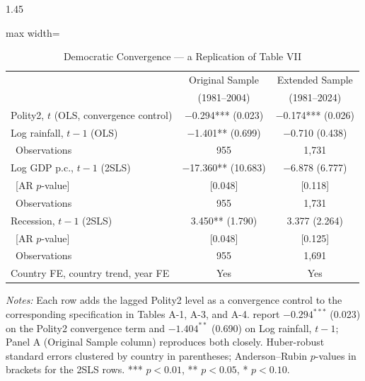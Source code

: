 \documentclass[12pt]{article}
\begin{document}
\begin{bibunit}[jpe]
\begin{spacing}{1.45}
\begin{table}[H]
\centering
\begin{adjustbox}{max width=\textwidth}
\begin{threeparttable}
\caption{Democratic Convergence --- a Replication of Table VII}
\label{tab:A5}
\begin{tabular}{lcc}
\toprule
 & Original Sample & Extended Sample \\
 & (1981--2004) & (1981--2024) \\
\midrule
Polity2, $t$ (OLS, convergence control) & $-$0.294*** (0.023) & $-$0.174*** (0.026) \\
Log rainfall, $t-1$ (OLS)               & $-$1.401** (0.699)  & $-$0.710 (0.438) \\
\ Observations                          & 955                 & 1{,}731 \\
Log GDP p.c., $t-1$ (2SLS)              & $-$17.360** (10.683) & $-$6.878 (6.777) \\
\ [AR $p$-value]                        & [0.048]             & [0.118] \\
\ Observations                          & 955                 & 1{,}731 \\
Recession, $t-1$ (2SLS)                 & 3.450** (1.790)     & 3.377 (2.264) \\
\ [AR $p$-value]                        & [0.048]             & [0.125] \\
\ Observations                          & 955                 & 1{,}691 \\
\midrule
Country FE, country trend, year FE & Yes & Yes \\
\bottomrule
\end{tabular}
\begin{tablenotes}[flushleft]
\footnotesize
\item \textit{Notes:} Each row adds the lagged Polity2 level as a convergence control to the corresponding specification in Tables A-1, A-3, and A-4. \citet{bruckner2011rain} report $-0.294^{***}$ (0.023) on the Polity2 convergence term and $-1.404^{**}$ (0.690) on Log rainfall, $t-1$; Panel A (Original Sample column) reproduces both closely. Huber-robust standard errors clustered by country in parentheses; Anderson--Rubin $p$-values in brackets for the 2SLS rows. *** $p<0.01$, ** $p<0.05$, * $p<0.10$.
\end{tablenotes}
\end{threeparttable}
\end{adjustbox}
\end{table}


\end{spacing}
\end{bibunit}
\end{document}
